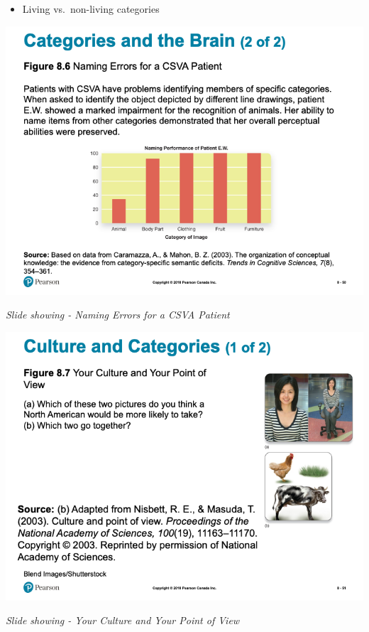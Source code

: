 \documentclass[
]{book}
\providecommand{\tightlist}{%
  \setlength{\itemsep}{0pt}\setlength{\parskip}{0pt}}
\begin{document}
\begin{reflect}
\begin{itemize}
  \begin{itemize}
  \tightlist
  \item
    Living vs.~non-living categories
  \end{itemize}
\end{itemize}

\includegraphics{assets/unit_1/slide_50.png}

\emph{Slide showing - Naming Errors for a CSVA Patient}

\includegraphics{assets/unit_1/slide_51.png}

\emph{Slide showing - Your Culture and Your Point of View}


\end{reflect}
\end{document}
